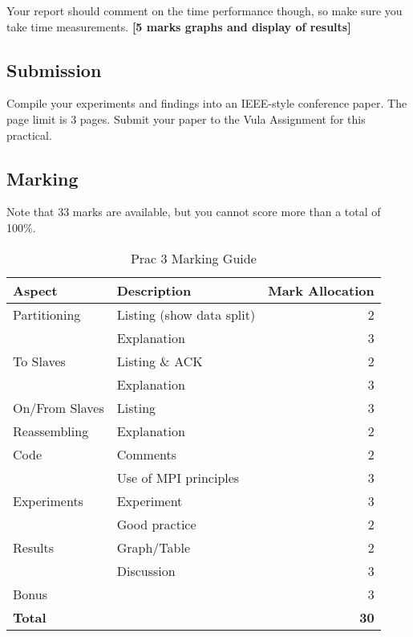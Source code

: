 Your report should comment on the time performance though, so make sure you take time measurements. \textbf{[5 marks graphs and display of results]}

\subsection{Submission}

Compile your experiments and findings into an IEEE-style conference paper. 
The page limit is 3 pages. Submit your paper to the Vula Assignment for this practical.

\subsection{Marking}
Note that 33 marks are available, but you cannot score more than a total of 100\%.
\begin{table}[H]
\centering
\caption{Prac 3 Marking Guide}
\label{tbl:Prac3Marks}
\begin{tabular}{|l|l|r|}
\hline
\textbf{Aspect} & \textbf{Description} & \multicolumn{1}{l|}{\textbf{Mark Allocation}} \\ \hline
Partitioning & Listing (show data split) & 2 \\ \hline
 & Explanation & 3 \\ \hline
To Slaves & Listing \& ACK & 2 \\ \hline
 & Explanation & 3 \\ \hline
On/From Slaves & Listing & 3 \\ \hline
Reassembling & Explanation & 2 \\ \hline
Code & Comments & 2 \\ \hline
 & Use of MPI principles & 3 \\ \hline
Experiments & Experiment & 3 \\ \hline
 & Good practice & 2 \\ \hline
Results & Graph/Table & 2 \\ \hline
 & Discussion & 3 \\ \hline
Bonus &  & 3 \\ \hline
\textbf{Total} &  & \textbf{30} \\ \hline
\end{tabular}
\end{table}